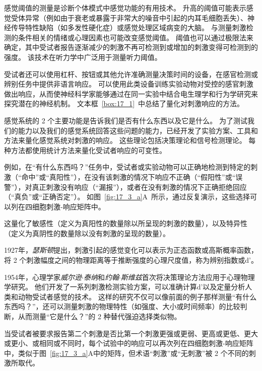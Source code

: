感觉阈值的测量是诊断个体模式中感觉功能的有用技术。 
升高的阈值可能表示感觉受体异常（例如由于衰老或暴露于非常大的噪音中引起的内耳毛细胞丢失）、神经传导特性缺陷（如多发性硬化症）或感觉处理区域病变的大脑。
与测量刺激检测的条件相关的情绪或心理因素也可能改变感觉阈值。
阈值也可以通过极限法来确定，其中受试者报告逐渐减少的刺激不再可检测到或增加的刺激变得可检测到的强度。
该技术在听力学中广泛用于测量听力阈值。


受试者还可以使用杠杆、按钮或其他允许准确测量决策时间的设备，在感官检测或辨别任务中提供非语言响应。
可以使用此类设备训练实验动物对受控的感官刺激做出响应，从而使神经科学家能够通过在同一实验中结合电生理学和行为学研究来探究潜在的神经机制。
文本框~\ref{box:17_1}~中总结了量化对刺激响应的方法。


\begin{proposition} \label{box:17_1}
	
	\quad \quad 感觉系统的 2 个主要功能是告诉我们是否有什么东西以及它是什么。
	为了测试我们的能力以及我们的感觉系统回答这些问题的能力，已经开发了实验方案、工具和方法来量化感觉系统对刺激的响应。
	这些理论包括决策理论和信号检测理论。
	每种方法都使用统计方法来量化受试者响应的可变性。
	
	\quad \quad 例如，在“有什么东西吗？”任务中，受试者或实验动物可以正确地检测到特定的刺激（“命中”或“真阳性”），在没有该刺激的情况下响应不正确（“假阳性”或“误警”），对真正刺激没有响应（“漏报”），或者在没有刺激的情况下正确拒绝回应（“真负”或“正确否定”）。
	如图~\ref{fig:17_3_a}A~所示，通过反复演示，这些选择可以列在四细胞刺激-响应矩阵中。
	
	\quad \quad 这量化了敏感性（定义为真阳性的数量除以所呈现的刺激的数量），以及特异性（定义为真阴性的数量除以没有刺激的呈现的数量）。
	
	\quad \quad 1927年，\textit{瑟斯顿}提出，刺激引起的感觉变化可以表示为正态函数或高斯概率函数，将 2 个刺激幅度之间的物理距离等于推断强度的心理尺度值，称为辨别指数或d'。
	
	\quad \quad 1954年，心理学家\textit{威尔逊$\cdot$泰纳}和\textit{约翰$\cdot$斯维兹}首次将决策理论方法应用于心理物理学研究。
	他们开发了一系列刺激检测实验方案，可以准确计算d'以及定量分析人类和动物受试者感觉的技术。
	这样的研究不仅可以像前面的例子那样测量“有什么东西吗？”，还可以测量刺激的物理特性（如强度、大小或时间频率）的比较判断，从而测量“它是什么？”的 2 种替代强迫选择类似物。
	
	\quad \quad 当受试者被要求报告第二个刺激是否比第一个刺激更强或更弱、更高或更低、更大或更小、或相同或不同时，每个试验中的响应可以再次列在四细胞刺激-响应矩阵中，类似于图~\ref{fig:17_3_a}A中的矩阵，但术语“刺激”或“无刺激”被 2 个不同的刺激所取代。
	

\end{proposition}
